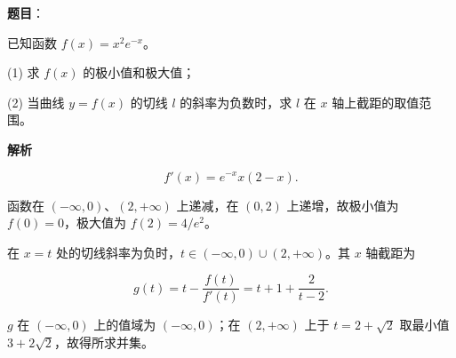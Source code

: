 \begin{answer}

\textbf{题目}：

已知函数 $f(x)=x^2e^{-x}$。

(1) 求 $f(x)$ 的极小值和极大值；

(2) 当曲线 $y=f(x)$ 的切线 $l$ 的斜率为负数时，求 $l$ 在 $x$ 轴上截距的取值范围。

\textbf{解析}


\nopagebreak[4]
\[f'(x)=e^{-x}x(2-x).\]

函数在 $(-\infty,0)$、$(2,+\infty)$ 上递减，在 $(0,2)$ 上递增，故极小值为 $f(0)=0$，极大值为 $f(2)=4/e^2$。


在 $x=t$ 处的切线斜率为负时，$t\in(-\infty,0)\cup(2,+\infty)$。其 $x$ 轴截距为

\nopagebreak[4]
\[g(t)=t-\frac{f(t)}{f'(t)}=t+1+\frac2{t-2}.\]

$g$ 在 $(-\infty,0)$ 上的值域为 $(-\infty,0)$；在 $(2,+\infty)$ 上于 $t=2+\sqrt2$ 取最小值 $3+2\sqrt2$，故得所求并集。


\gkanswer{答案（2）：$(-\infty,0)\cup[3+2\sqrt2,+\infty)$。}

\end{answer}
